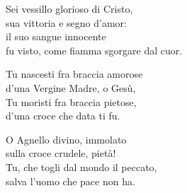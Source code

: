 

\spazio

\strofa Sei vessillo glorioso di Cristo,\\
sua vittoria e segno d'amor:\\
il suo sangue innocente\\
fu visto, come fiamma sgorgare dal cuor.

\spazio


\spazio

\strofa Tu nascesti fra braccia amorose\\
d'una Vergine Madre, o Gesù,\\
Tu moristi fra braccia pietose,\\
d'una croce che data ti fu.

\spazio


\spazio

\strofa O Agnello divino, immolato\\
sulla croce crudele, pietà!\\
Tu, che togli dal mondo il peccato,\\
salva l'uomo che pace non ha.

\spazio

